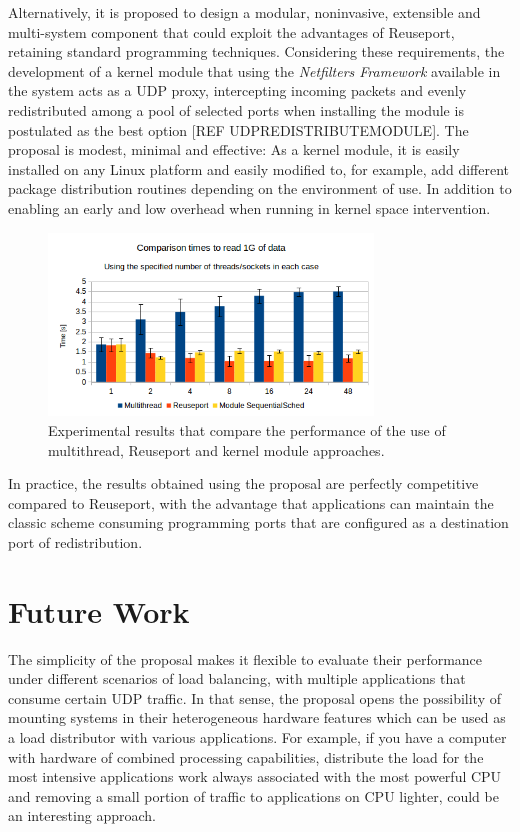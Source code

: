 \documentclass[journal]{IEEEtran}
\begin{document}
Alternatively, it is proposed to design a modular, noninvasive, extensible and multi-system component that could exploit the advantages of Reuseport, retaining standard programming techniques. Considering these requirements, the development of a kernel module that using the \emph{Netfilters Framework} available in the system acts as a UDP proxy, intercepting incoming packets and evenly redistributed among a pool of selected ports when installing the module is postulated as the best option [REF UDPREDISTRIBUTEMODULE]. The proposal is modest, minimal and effective: As a kernel module, it is easily installed on any Linux platform and easily modified to, for example, add different package distribution routines depending on the environment of use. In addition to enabling an early and low overhead when running in kernel space intervention.
\begin{figure}[!h]
\centering
  \includegraphics[width=3.4in]{Imagenes/graficoModulo}
  \caption{Experimental results that compare the performance of the use of multithread, Reuseport and kernel module approaches.}
  \label{fig:chart}
\end{figure}
In practice, the results obtained using the proposal are perfectly competitive compared to Reuseport, with the advantage that applications can maintain the classic scheme consuming programming ports that are configured as a destination port of redistribution.

\section{Future Work}
The simplicity of the proposal makes it flexible to evaluate their performance under different scenarios of load balancing, with multiple applications that consume certain UDP traffic. In that sense, the proposal opens the possibility of mounting systems in their heterogeneous hardware features which can be used as a load distributor with various applications. For example, if you have a computer with hardware of combined processing capabilities, distribute the load for the most intensive applications work always associated with the most powerful CPU and removing a small portion of traffic to applications on CPU lighter, could be an interesting approach.
\end{document}
